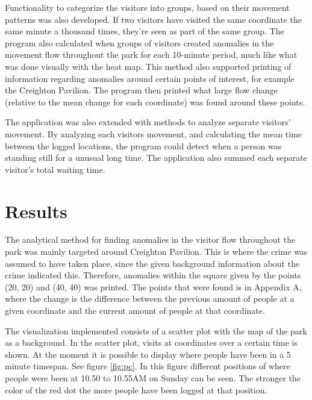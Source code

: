 \documentclass[journal]{vgtc}                %
\begin{document}
Functionality to categorize the visitors into groups, based on their movement patterns was also developed. If two visitors have visited the same coordinate the same minute a thousand times, they’re seen as part of the same group. The program also calculated when groups of visitors created anomalies in the movement flow throughout the park for each 10-minute period, much like what was done visually with the heat map. This method also supported printing of information regarding anomalies around certain points of interest, for example the Creighton Pavilion. The program then printed what large flow change (relative to the mean change for each coordinate) was found around these points.

The application was also extended with methods to analyze separate visitors’ movement. By analyzing each visitors movement, and calculating the mean time between the logged locations, the program could detect when a person was standing still for a unusual long time. The application also summed each separate visitor’s total waiting time.


\section{Results}
The analytical method for finding anomalies in the visitor flow throughout the park was mainly targeted around Creighton Pavilion. This is where the crime was assumed to have taken place, since the given background information about the crime indicated this. Therefore, anomalies within the square given by the points (20, 20) and (40, 40) was printed. The points that were found is in Appendix A, where the change is the difference between the previous amount of people at a given coordinate and the current amount of people at that coordinate.

The visualization implemented consists of a scatter plot with the map of the park as a background. In the scatter plot, visits at coordinates over a certain time is shown. At the moment it is possible to display where people have been in a 5 minute timespan. See figure \ref{fig:pc}. In this figure different positions of where people were been at 10.50 to 10.55AM on Sunday can be seen. The stronger the color of the red dot the more people have been logged at that position.
\end{document}
